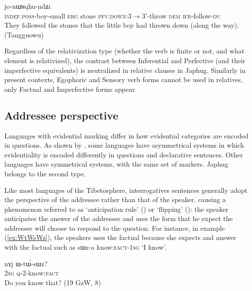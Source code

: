 \documentclass[oldfontcommands,oneside,a4paper,11pt]{article}
\newcommand{\ipa}[1]{{\phon \mbox{#1}}} %
\newcommand{\refb}[1]{(\ref{#1})}
\begin{document}
\begin{exe}
\ex  \label{ex:paBde}
\gll  [\ipa{tɤ-tɕɯ-pɯ} 	\ipa{kɯ} 	\ipa{rdɤstaʁ} 	\ipa{pa-βde}] 	\ipa{nɯ} 	\ipa{jo-nɯɴqhu-ndʑi}  \\
\textsc{indef.poss}-boy-small \textsc{erg} stone \textsc{pfv:down}:3$\rightarrow$3'-throw \textsc{dem} \textsc{ifr}-follow-\textsc{du} \\
\glt They followed the stones that the little boy had thrown down (along the way). (Tangguowu)
\end{exe}

Regardless of the relativization type (whether the verb is finite or not, and what element is relativized), the contrast between Inferential and  Perfective (and their imperfective equivalents) is neutralized in relative clauses in Japhug. Similarly in present contexts, Egophoric and Sensory verb forms cannot be used in relatives, only Factual and Imperfective forms appear.

\subsection{Addressee perspective} \label{sec:anticipation}
Languages with evidential marking differ in how evidential categories are encoded in questions. As shown by \citet{sanroque15interrogativity}, some languages have asymmetrical systems in which evidentiality is encoded differently in questions and declarative sentences. Other languages have symmetrical systems, with the same set of markers. Japhug belongs to the second type. 

Like most languages of the Tibetosphere, interrogatives sentences generally adopt the perspective of the addressee rather than that of the speaker, causing a phenomenon referred to as `anticipation rule' (\citealt[244]{tournadre14evidentiality}) or `flipping' (\citealt{sanroque15interrogativity}):   the speaker anticipates the answer of the addressee and uses the form that he expect the addressee will choose to respond to the question. For instance, in example \refb{ex:WtWsWz}, the speakers uses the factual because she expects and answer with the factual such as \ipa{sɯz-a} know:\textsc{fact}-\textsc{1sg} `I know'.

\begin{exe}
\ex \label{ex:WtWsWz}
\gll 
\ipa{nɤj}	\ipa{ɯ-tɯ́-sɯz?} \\
\textsc{2sg} \textsc{q}-2-know:\textsc{fact} \\
\glt Do you know that? (19 GzW, 8)
\end{exe}
\end{document}
